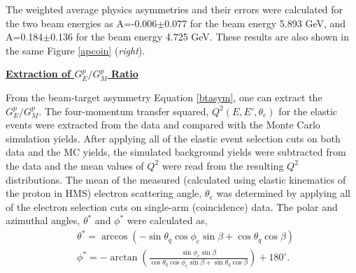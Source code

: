 \documentclass[12pt]{article}
\begin{document}
\vspace{0.3cm}
The weighted average physics asymmetries and their errors were calculated for the two beam energies as A=-0.006$\pm$0.077 for the beam energy 5.893 GeV, and A=0.184$\pm$0.136 for the beam energy 4.725 GeV. These results are also shown in the same Figure \ref{apcoin} (\emph{right}).

\vspace{0.3cm}
{
\raggedleft
\underline{\textbf{Extraction of $G^p_E/G^p_M$ Ratio}}
}



From the beam-target asymmetry Equation \eqref{btasym}, one can extract the $G_E^p/G_M^p$. The four-momentum transfer squared, $Q^2(E, E', \theta_e)$ for the elastic events were extracted from the data and compared with the Monte Carlo simulation yields. After applying all of the elastic event selection cuts on both data and the MC yields, the simulated background yields were subtracted from the data and the mean values of $Q^2$ were read from the resulting $Q^2$ distributions. The mean of the measured (calculated using elastic kinematics of the proton in HMS) electron scattering angle, $\theta_e$ was determined by applying all of the electron selection cuts on single-arm (coincidence) data. The polar and azimuthal angles, $\theta^*$ and $\phi ^*$ were calculated as,
 \begin{equation}
 \begin{aligned}
\label{thetastar}
&\theta^*=\arccos (-\sin \theta_q\cos\phi_e\sin\beta+\cos\theta_q\cos \beta)\\
&\phi^*=-\arctan\left(\frac{\sin \phi_e \sin \beta}{\cos \theta_q \cos \phi_e \sin \beta + \sin \theta_q \cos \beta}\right)+180^{\circ}.
\end{aligned}
\end{equation}
\end{document}
